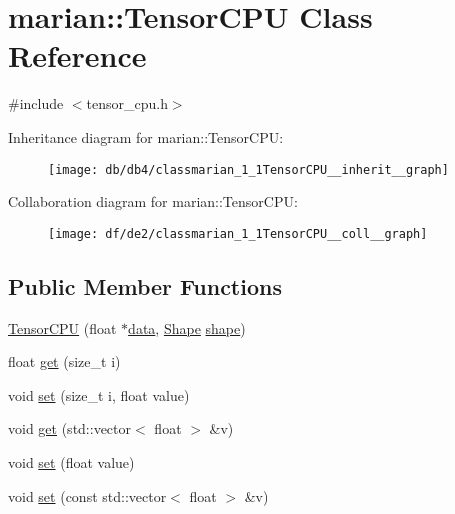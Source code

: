 \hypertarget{classmarian_1_1TensorCPU}{}\section{marian\+:\+:Tensor\+C\+PU Class Reference}
\label{classmarian_1_1TensorCPU}


{\ttfamily \#include $<$tensor\+\_\+cpu.\+h$>$}



Inheritance diagram for marian\+:\+:Tensor\+C\+PU\+:
\nopagebreak
\begin{figure}[H]
\begin{center}
\leavevmode
\texttt{[image: db/db4/classmarian\_1\_1TensorCPU\_\_inherit\_\_graph]}
\end{center}
\end{figure}


Collaboration diagram for marian\+:\+:Tensor\+C\+PU\+:
\nopagebreak
\begin{figure}[H]
\begin{center}
\leavevmode
\texttt{[image: df/de2/classmarian\_1\_1TensorCPU\_\_coll\_\_graph]}
\end{center}
\end{figure}
\subsection*{Public Member Functions}
\begin{DoxyCompactItemize}
\item 
\hyperlink{classmarian_1_1TensorCPU_a3e5666197c38deed084d1d39832e0f48}{Tensor\+C\+PU} (float $\ast$\hyperlink{classmarian_1_1TensorBase_a67e5b255f621fbae8152d5e75dbb2339}{data}, \hyperlink{structmarian_1_1Shape}{Shape} \hyperlink{classmarian_1_1TensorBase_adbee0ca45fa5a195171a99fc7a9b00c8}{shape})
\item 
float \hyperlink{classmarian_1_1TensorCPU_af186f6647176e261a5baf1c6609eeaa2}{get} (size\+\_\+t i)
\item 
void \hyperlink{classmarian_1_1TensorCPU_abfd193889e623394d1aaa6ca5422489c}{set} (size\+\_\+t i, float value)
\item 
void \hyperlink{classmarian_1_1TensorCPU_a783de048c2d0a6400359bac0f3268080}{get} (std\+::vector$<$ float $>$ \&v)
\item 
void \hyperlink{classmarian_1_1TensorCPU_ac5ce20b62588fe95e38d2edaa2fb3c5b}{set} (float value)
\item 
void \hyperlink{classmarian_1_1TensorCPU_a6ab34ca2fa6d297c4ae2686bdaff12a2}{set} (const std\+::vector$<$ float $>$ \&v)
\end{DoxyCompactItemize}


